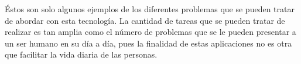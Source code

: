 Éstos son solo algunos ejemplos de los diferentes problemas que se pueden tratar de abordar con esta tecnología. La cantidad de tareas que se pueden tratar de realizar es tan amplia como el número de problemas que se le pueden presentar a un ser humano en su día a día, pues la finalidad de estas aplicaciones no es otra que facilitar la vida diaria de las personas.
